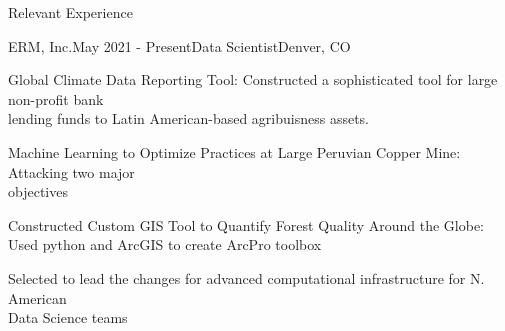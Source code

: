 \documentclass{resume} %
\begin{document}
\begin{rSection}{Relevant Experience}

\begin{rSubsection}{ERM, Inc.}{May 2021 - Present}{Data Scientist}{Denver, CO} 
\item {Global Climate Data Reporting Tool: Constructed a sophisticated tool for large non-profit bank \\ lending funds to Latin American-based agribuisness assets.}
    \vspace{-0.5em}
    \vspace{-0.5em}
    \vspace{0.25em}
\item {Machine Learning to Optimize Practices at Large Peruvian Copper Mine: Attacking two major \\ objectives}
    \vspace{-0.5em}
    \vspace{-0.5em}
    \vspace{0.25em}
\item {Constructed Custom GIS Tool to Quantify Forest Quality Around the Globe: Used python and ArcGIS to create ArcPro toolbox}
    \vspace{-0.5em}
    \vspace{-0.5em}
    \vspace{0.25em}
\item {Selected to lead the changes for advanced computational infrastructure for N. American \\ Data Science teams}

\end{rSubsection} 



\end{rSection}
\end{document}

